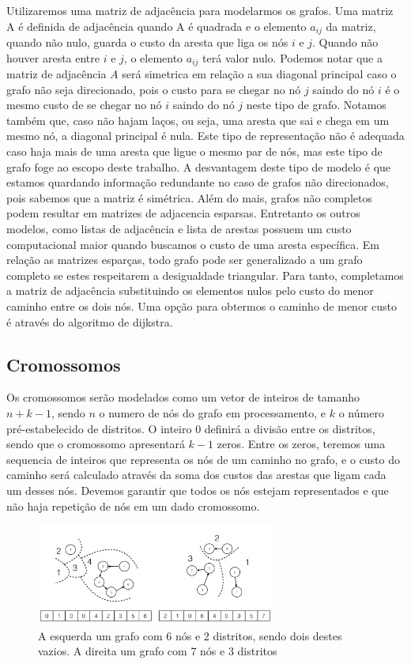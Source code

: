 \documentclass[12pt]{elsarticle}
\begin{document}
    Utilizaremos uma matriz de adjacência para modelarmos os grafos. Uma matriz A é definida de adjacência quando A é quadrada e o elemento $a_{ij}$ da matriz, quando não nulo, guarda o custo da aresta que liga os nós $i$ e $j$. Quando não houver aresta entre $i$ e $j$, o elemento $a_{ij}$ terá valor nulo. Podemos notar que a matriz de adjacência $A$ será simetrica em relação a sua diagonal principal caso o grafo não seja direcionado, pois o custo para se chegar no nó $j$ saindo do nó $i$ é o mesmo custo de se chegar no nó $i$ saindo do nó $j$ neste tipo de grafo. Notamos também que, caso não hajam laços, ou seja, uma aresta que sai e chega em um mesmo nó, a diagonal principal é nula.
    Este tipo de representação não é adequada caso haja mais de uma aresta que ligue o mesmo par de nós, mas este tipo de grafo foge ao escopo deste trabalho.
    A desvantagem deste tipo de modelo é que estamos quardando informação redundante no caso de grafos não direcionados, pois sabemos que a matriz é simétrica. Além do mais, grafos não completos podem resultar em matrizes de adjacencia esparsas. Entretanto os outros modelos, como listas de adjacência e lista de arestas possuem um custo computacional maior quando buscamos o custo de uma aresta específica. Em relação as matrizes esparças, todo grafo pode ser generalizado a um grafo completo se estes respeitarem a desigualdade triangular. Para tanto, completamos a matriz de adjacência substituindo os elementos nulos pelo custo do menor caminho entre os dois nós. Uma opção para obtermos o caminho de menor custo é através do algoritmo de dijkstra\cite{algoritmos}.
    
    \subsection{Cromossomos}
    
    Os cromossomos serão modelados como um vetor de inteiros de tamanho $n+k-1$, sendo $n$ o numero de nós do grafo em processamento, e $k$ o número pré-estabelecido de distritos. O inteiro $0$ definirá a divisão entre os distritos, sendo que o cromossomo apresentará $k-1$ zeros. Entre os zeros, teremos uma sequencia de inteiros que representa os nós de um caminho no grafo, e o custo do caminho será calculado através da soma dos custos das arestas que ligam cada um desses nós. Devemos garantir que todos os nós estejam representados e que não haja repetição de nós em um dado cromossomo.
    
\begin{figure}[H]
\centering
\includegraphics[width=0.7\textwidth]{distrito.png}
\vspace{0.5cm}
\caption{\label{fig:distrito}A esquerda um grafo com 6 nós e 2 distritos, sendo dois destes vazios. A direita um grafo com 7 nós e 3 distritos}
\end{figure}
    
\end{document}
